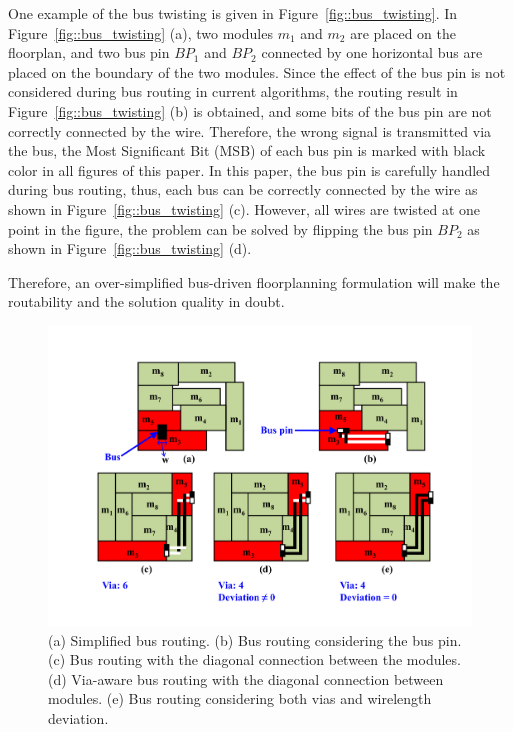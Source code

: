 One example of the bus twisting is given in Figure~\ref{fig::bus_twisting}.
In Figure~\ref{fig::bus_twisting} (a), two modules $m_1$ and $m_2$ are placed
on the floorplan, and two bus pin $BP_1$ and $BP_2$ connected by one horizontal bus
are placed on the boundary of the two modules. Since the effect of the bus pin
is not considered during bus routing in current algorithms,
the routing result in Figure~\ref{fig::bus_twisting} (b)
is obtained, and some bits of the bus pin are not correctly connected
by the wire. Therefore, the wrong signal is transmitted via the bus,
the Most Significant Bit (MSB) of each bus pin is marked with black color
in all figures of this paper.
In this paper, the bus pin is carefully handled during bus routing, thus,
each bus can be correctly connected by the wire as shown in Figure~\ref{fig::bus_twisting} (c).
However, all wires are twisted at one point in the figure,
the problem can be solved by flipping the bus pin $BP_2$ as shown in Figure~\ref{fig::bus_twisting} (d).

Therefore, an over-simplified bus-driven floorplanning formulation will
make the routability and the solution quality in doubt.

\begin{figure}[htb]
  \centering
    \includegraphics[width=13cm]{Fig/introduction_example.pdf}
     \caption{
      (a) Simplified bus routing. (b) Bus routing considering the bus pin. (c) Bus routing with the diagonal connection between the modules. (d) Via-aware bus routing with the diagonal connection between modules. (e) Bus routing considering both vias and wirelength deviation.
   }
  \label{fig::introduction_example}
\end{figure}

